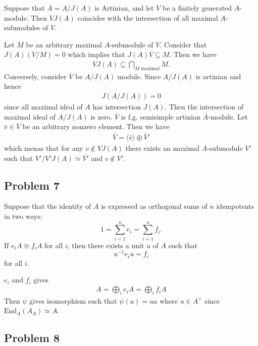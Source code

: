 Suppose that \(\overline{A}=A/J(A)\) is Artinian, and let \(V\) be a finitely
generated \(A\)-module. Then \(VJ(A)\) coincides with the intersection of all
maximal \(A\)-submodules of \(V\).
\begin{solution}
    Let $M$ be an arbitrary maximal $A$-submodule of $V$. Consider that $J(A)(V/M) = 0$ which implies that $J(A)V \subseteq M$. Then we have 
    \begin{align*}
        VJ(A) \subseteq \bigcap_{M\text{ maximal}} M.
    \end{align*}
    Conversely, consider $\bar{V}$ be $A/J(A)$ module. Since $A/J(A)$ is artinian and hence 
    \begin{align*}
        J(A/J(A)) = 0
    \end{align*}
    since all maximal ideal of $A$ has intersection $J(A)$. Then the intersection of maximal ideal of $A/J(A)$ is zero.
    $\bar{V}$ is f.g. semisimple artinian $\bar{A}$-module. Let $\bar{v}\in \bar{V}$ be an arbitrary nonzero element. Then we have 
    \begin{align*}
        \bar{V} = \langle\bar{v}\rangle \oplus \bar{V}'
    \end{align*}
    which menas that for any $v\notin VJ(A)$ there exists an maximal $A$-submodule $V'$ such that $V'/V'J(A)\simeq \bar{V'}$ and $v\notin V'$. 
\end{solution}


\subsection{Problem 7}

Suppose that the identity of \(A\) is expressed as orthogonal sums of \(n\)
idempotents in two ways:
\[
1=\sum_{i=1}^n e_i=\sum_{i=1}^n f_i.
\]
If \(e_iA\cong f_iA\) for all \(i\), then there exists a unit \(u\) of \(A\)
such that
\[
u^{-1}e_i u=f_i
\]
for all \(i\).
\begin{solution}
    $e_i$ and $f_i$ gives 
    \begin{align*}
        A = \bigoplus_{i} e_iA  = \bigoplus_{i} f_iA 
    \end{align*}
    Then $\psi$ gives isomorphism such that $\psi(a)=ua$ where $u\in A^\times$ since $\text{End}_{A}(A_A) \simeq A$. 
\end{solution}


\subsection{Problem 8}

